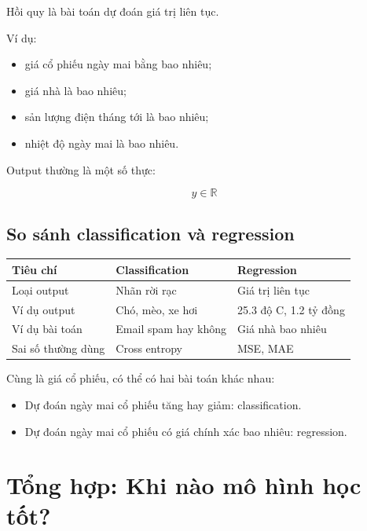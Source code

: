 Hồi quy là bài toán dự đoán giá trị liên tục.

Ví dụ:

\begin{itemize}
    \item giá cổ phiếu ngày mai bằng bao nhiêu;
    \item giá nhà là bao nhiêu;
    \item sản lượng điện tháng tới là bao nhiêu;
    \item nhiệt độ ngày mai là bao nhiêu.
\end{itemize}

Output thường là một số thực:

\[
    y \in \mathbb{R}
\]

\subsection{So sánh classification và regression}

\begin{center}
\begin{tabular}{p{}p{}p{}}
\toprule
Tiêu chí & Classification & Regression \\
\midrule
Loại output & Nhãn rời rạc & Giá trị liên tục \\
Ví dụ output & Chó, mèo, xe hơi & 25.3 độ C, 1.2 tỷ đồng \\
Ví dụ bài toán & Email spam hay không & Giá nhà bao nhiêu \\
Sai số thường dùng & Cross entropy & MSE, MAE \\
\bottomrule
\end{tabular}
\end{center}

\begin{vidu}
Cùng là giá cổ phiếu, có thể có hai bài toán khác nhau:

\begin{itemize}
    \item Dự đoán ngày mai cổ phiếu tăng hay giảm: classification.
    \item Dự đoán ngày mai cổ phiếu có giá chính xác bao nhiêu: regression.
\end{itemize}
\end{vidu}

\section{Tổng hợp: Khi nào mô hình học tốt?}

